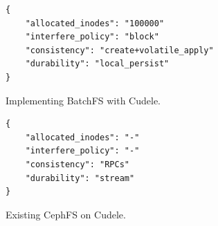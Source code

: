 \begin{listing}
\begin{verbatim}
{     
    "allocated_inodes": "100000"
    "interfere_policy": "block"
    "consistency": "create+volatile_apply"
    "durability": "local_persist"
}
\end{verbatim}
\caption{Implementing BatchFS with Cudele.}
\label{src:batchfs}
\end{listing}

\begin{listing}
\begin{verbatim}
{     
    "allocated_inodes": "-"
    "interfere_policy": "-"
    "consistency": "RPCs"
    "durability": "stream"
}
\end{verbatim}
\caption{Existing CephFS on Cudele.}
\label{src:batchfs}
\end{listing}

%


